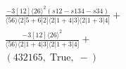 \documentclass[varwidth, border=5pt]{standalone}
\begin{document}
\begin{my}
$\begin{gathered}
\scriptscriptstyle\frac{-3[12]⟨26⟩^2\scriptscriptstyle(s12-s134-s34)}{⟨56⟩⟨2|5+6|2]⟨2|1+4|3]⟨2|1+3|4]}+\\
\scriptscriptstyle\frac{-3[12]⟨26⟩^2}{⟨56⟩⟨2|1+4|3]⟨2|1+3|4]}+\\
\scriptscriptstyle(432165,\;\text{True},\;-)\phantom{+}
\end{gathered}$
\end{my}
\end{document}
